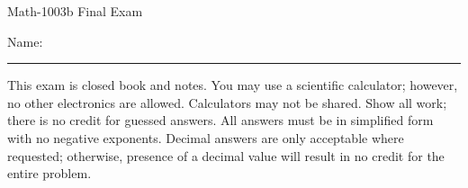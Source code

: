 \documentclass[letterpaper,12pt,fleqn]{article}
\begin{document}
\begin{center}
\Large Math-1003b Final Exam
\end{center}

\vspace{0.5in}

Name: \rule{4in}{1pt}

\vspace{0.5in}

This exam is closed book and notes. You may use a scientific calculator;
however, no other electronics are allowed. Calculators may not be shared.
Show all work; there is no credit for guessed answers. All answers must be in
simplified form with no negative exponents. Decimal answers are only acceptable
where requested; otherwise, presence of a decimal value will result in no
credit for the entire problem.

\vspace{1in}
\end{document}
